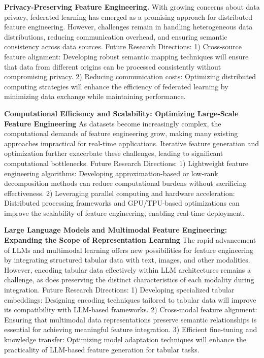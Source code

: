 \noindent\textbf{Privacy-Preserving Feature Engineering.}
With growing concerns about data privacy, federated learning has emerged as a promising approach for distributed feature engineering. However, challenges remain in handling heterogeneous data distributions, reducing communication overhead, and ensuring semantic consistency across data sources. Future Research Directions:
1) Cross-source feature alignment: Developing robust semantic mapping techniques will ensure that data from different origins can be processed consistently without compromising privacy.
2) Reducing communication costs: Optimizing distributed computing strategies will enhance the efficiency of federated learning by minimizing data exchange while maintaining performance.


\noindent\textbf{Computational Efficiency and Scalability: Optimizing Large-Scale Feature Engineering}
As datasets become increasingly complex, the computational demands of feature engineering grow, making many existing approaches impractical for real-time applications. Iterative feature generation and optimization further exacerbate these challenges, leading to significant computational bottlenecks. Future Research Directions:
1) Lightweight feature engineering algorithms: Developing approximation-based or low-rank decomposition methods can reduce computational burdens without sacrificing effectiveness.
2) Leveraging parallel computing and hardware acceleration: Distributed processing frameworks and GPU/TPU-based optimizations can improve the scalability of feature engineering, enabling real-time deployment.

\noindent\textbf{Large Language Models and Multimodal Feature Engineering: Expanding the Scope of Representation Learning}
The rapid advancement of LLMs and multimodal learning offers new possibilities for feature engineering by integrating structured tabular data with text, images, and other modalities. However, encoding tabular data effectively within LLM architectures remains a challenge, as does preserving the distinct characteristics of each modality during integration. Future Research Directions:
1) Developing specialized tabular embeddings: Designing encoding techniques tailored to tabular data will improve its compatibility with LLM-based frameworks.
2) Cross-modal feature alignment: Ensuring that multimodal data representations preserve semantic relationships is essential for achieving meaningful feature integration.
3) Efficient fine-tuning and knowledge transfer: Optimizing model adaptation techniques will enhance the practicality of LLM-based feature generation for tabular tasks.

